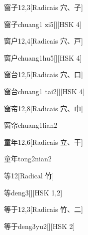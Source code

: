 \begin{entry}{窗子}{12,3}[Radicais ⽳、⼦]
  \begin{phonetics}{窗子}{chuang1 zi5}[][HSK 4]
  \end{phonetics}
\end{entry}

\begin{entry}{窗户}{12,4}[Radicais ⽳、⼾]
  \begin{phonetics}{窗户}{chuang1hu5}[][HSK 4]
  \end{phonetics}
\end{entry}

\begin{entry}{窗台}{12,5}[Radicais ⽳、⼝]
  \begin{phonetics}{窗台}{chuang1 tai2}[][HSK 4]
  \end{phonetics}
\end{entry}

\begin{entry}{窗帘}{12,8}[Radicais ⽳、⼱]
  \begin{phonetics}{窗帘}{chuang1lian2}
  \end{phonetics}
\end{entry}

\begin{entry}{童年}{12,6}[Radicais ⽴、⼲]
  \begin{phonetics}{童年}{tong2nian2}
  \end{phonetics}
\end{entry}

\begin{entry}{等}{12}[Radical ⽵]
  \begin{phonetics}{等}{deng3}[][HSK 1,2]
  \end{phonetics}
\end{entry}

\begin{entry}{等于}{12,3}[Radicais ⽵、⼆]
  \begin{phonetics}{等于}{deng3yu2}[][HSK 2]
  \end{phonetics}
\end{entry}

